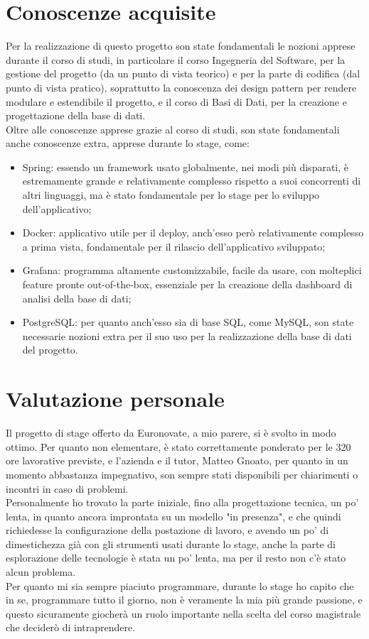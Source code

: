 \section{Conoscenze acquisite}
	Per la realizzazione di questo progetto son state fondamentali le nozioni apprese durante il corso di studi, in particolare il corso Ingegneria del Software, per la gestione del progetto (da un punto di vista teorico) e per la parte di codifica (dal punto di vista pratico), soprattutto la conoscenza dei design pattern per rendere modulare e estendibile il progetto, e il corso di Basi di Dati, per la creazione e progettazione della base di dati. \\
	Oltre alle conoscenze apprese grazie al corso di studi, son state fondamentali anche conoscenze extra, apprese durante lo stage, come:
	\begin{itemize}
		\item Spring: essendo un framework usato globalmente, nei modi più disparati, è estremamente grande e relativamente complesso rispetto a suoi concorrenti di altri linguaggi, ma è stato fondamentale per lo stage per lo sviluppo dell'applicativo;
		\item Docker: applicativo utile per il deploy, anch'esso però relativamente complesso a prima vista, fondamentale per il rilascio dell'applicativo sviluppato;
		\item Grafana: programma altamente customizzabile, facile da usare, con molteplici feature pronte out-of-the-box, essenziale per la creazione della dashboard di analisi della base di dati;
		\item PostgreSQL: per quanto anch'esso sia di base SQL, come MySQL, son state necessarie nozioni extra per il suo uso per la realizzazione della base di dati del progetto.
	\end{itemize}
	

\section{Valutazione personale}
	Il progetto di stage offerto da Euronovate, a mio parere, si è svolto in modo ottimo. Per quanto non elementare, è stato correttamente ponderato per le 320 ore lavorative previste, e l'azienda e il tutor, Matteo Gnoato, per quanto in un momento abbastanza impegnativo, son sempre stati disponibili per chiarimenti o incontri in caso di problemi. \\
	Personalmente ho trovato la parte iniziale, fino alla progettazione tecnica,  un po' lenta, in quanto ancora improntata su un modello "in presenza", e che quindi richiedesse la configurazione della postazione di lavoro, e avendo un po' di dimestichezza già con gli strumenti usati durante lo stage, anche la parte di esplorazione delle tecnologie è stata un po' lenta, ma per il resto non c'è stato alcun problema. \\
	Per quanto mi sia sempre piaciuto programmare, durante lo stage ho capito che in se, programmare tutto il giorno, non è veramente la mia più grande passione, e questo sicuramente giocherà un ruolo importante nella scelta del corso magistrale che deciderò di intraprendere.
